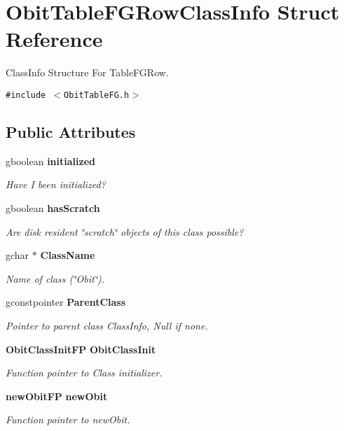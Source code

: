\section{Obit\-Table\-FGRow\-Class\-Info Struct Reference}
\label{structObitTableFGRowClassInfo}
Class\-Info Structure For Table\-FGRow.  


{\tt \#include $<$Obit\-Table\-FG.h$>$}

\subsection*{Public Attributes}
\begin{CompactItemize}
\item 
gboolean {\bf initialized}
\begin{CompactList}\small\item\em Have I been initialized? \item\end{CompactList}\item 
gboolean {\bf has\-Scratch}
\begin{CompactList}\small\item\em Are disk resident \char`\"{}scratch\char`\"{} objects of this class possible? \item\end{CompactList}\item 
gchar $\ast$ {\bf Class\-Name}
\begin{CompactList}\small\item\em Name of class (\char`\"{}Obit\char`\"{}). \item\end{CompactList}\item 
gconstpointer {\bf Parent\-Class}
\begin{CompactList}\small\item\em Pointer to parent class Class\-Info, Null if none. \item\end{CompactList}\item 
{\bf Obit\-Class\-Init\-FP} {\bf Obit\-Class\-Init}
\begin{CompactList}\small\item\em Function pointer to Class initializer. \item\end{CompactList}\item 
{\bf new\-Obit\-FP} {\bf new\-Obit}
\begin{CompactList}\small\item\em Function pointer to new\-Obit. \item\end{CompactList}\item 

\end{CompactItemize}
